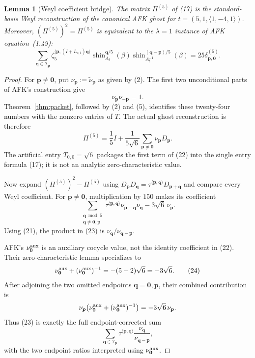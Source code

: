 \documentclass[11pt]{article}
\newtheorem{lemma}[theorem]{Lemma}
\begin{document}
\begin{lemma}[Weyl coefficient bridge]\label{lem:bridge}
The matrix $\Pi^{(5)}$ of (17) is the standard-basis Weyl reconstruction of
the canonical AFK ghost for
$t=(5,1,\langle1,-4,1\rangle)$.  Moreover,
$(\Pi^{(5)})^2=\Pi^{(5)}$ is equivalent to
the $\lambda=1$ instance of AFK equation~(1.49):
\[
\sum_{\boldsymbol q\in\mathcal I_{\boldsymbol p}}
\zeta_5^{\langle\boldsymbol p,(I+L_{z,t})\boldsymbol q\rangle}
\operatorname{shin}_{A_t}^{\boldsymbol q/5}(\beta)
\operatorname{shin}_{A_t^{-1}}^{(\boldsymbol q-\boldsymbol p)/5}(\beta)
=25\delta_{\boldsymbol p,\boldsymbol0}^{(5)}.
\tag{20}
\]
\end{lemma}

\begin{proof}
For $\boldsymbol p\ne\boldsymbol0$, put
$\nu_{\boldsymbol p}:=\widetilde\nu_{\boldsymbol p}$ as given by
(2).  The first two unconditional parts of AFK's construction give
\[
 \nu_{\boldsymbol p}\nu_{-\boldsymbol p}=1.
\tag{21}
\]
Theorem~\ref{thm:packet}, followed by (2) and (5), identifies these
twenty-four numbers with the nonzero entries of $T$.  The actual ghost
reconstruction is therefore
\[
 \Pi^{(5)}=\frac15I+\frac1{5\sqrt6}
 \sum_{\boldsymbol p\ne\boldsymbol0}
 \nu_{\boldsymbol p}D_{\boldsymbol p}.
\tag{22}
\]
The artificial entry $T_{0,0}=\sqrt6$ packages the first term of
(22) into the single entry formula (17); it is not an analytic
zero-characteristic value.

Now expand $(\Pi^{(5)})^2-\Pi^{(5)}$ using
$D_{\boldsymbol p}D_{\boldsymbol q}
=\tau^{\langle\boldsymbol p,\boldsymbol q\rangle}
D_{\boldsymbol p+\boldsymbol q}$ and compare every Weyl coefficient.
For $\boldsymbol p\ne\boldsymbol0$, multiplication by $150$ makes its
coefficient
\[
 \sum_{\substack{\boldsymbol q\bmod5\\
 \boldsymbol q\ne\boldsymbol0,\boldsymbol p}}
 \tau^{\langle\boldsymbol p,\boldsymbol q\rangle}
 \nu_{\boldsymbol p-\boldsymbol q}\nu_{\boldsymbol q}
-3\sqrt6\,\nu_{\boldsymbol p}.
\tag{23}
\]
Using (21), the product in (23) is
$\nu_{\boldsymbol q}/\nu_{\boldsymbol q-\boldsymbol p}$.

AFK's $\nu_{\boldsymbol0}^{\rm aux}$ is an auxiliary cocycle value,
not the identity coefficient in (22).  Their zero-characteristic
lemma specializes to
\[
 \nu_{\boldsymbol0}^{\rm aux}
+(\nu_{\boldsymbol0}^{\rm aux})^{-1}
=-(5-2)\sqrt6=-3\sqrt6.
\tag{24}
\]
After adjoining the two omitted endpoints
$\boldsymbol q=\boldsymbol0,\boldsymbol p$, their combined contribution
is
\[
 \nu_{\boldsymbol p}\!
 \left(\nu_{\boldsymbol0}^{\rm aux}
+(\nu_{\boldsymbol0}^{\rm aux})^{-1}\right)
=-3\sqrt6\,\nu_{\boldsymbol p}.
\]
Thus (23) is exactly the full endpoint-corrected sum
\[
 \sum_{\boldsymbol q\in\mathcal I_{\boldsymbol p}}
 \tau^{\langle\boldsymbol p,\boldsymbol q\rangle}
 \frac{\nu_{\boldsymbol q}}
 {\nu_{\boldsymbol q-\boldsymbol p}},
\tag{25}
\]
with the two endpoint ratios interpreted using
$\nu_{\boldsymbol0}^{\rm aux}$.


\end{proof}
\end{document}
